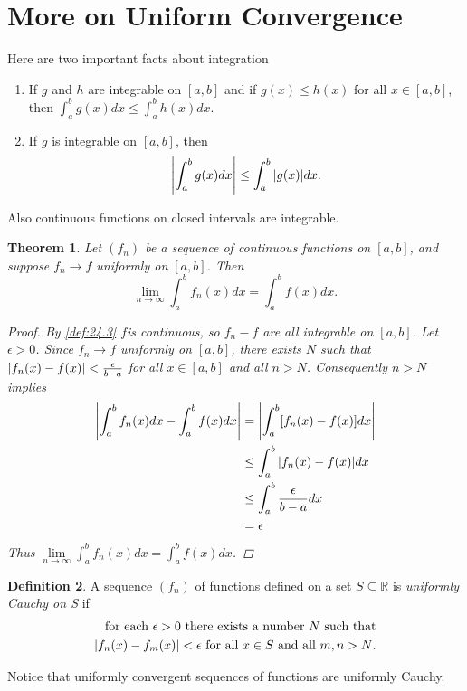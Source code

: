 \documentclass[12pt, lettersize]{book}
\theoremstyle{plain}
\newtheorem{thm}{Theorem}[section]
\theoremstyle{definition}
\newtheorem{dfn}[thm]{Definition}
\theoremstyle{remark}
\newcommand{\R}{\mathbb{R}}
\begin{document}
		\section{More on Uniform Convergence}
			Here are two important facts about integration
			\begin{enumerate}
				\item If $g$ and $h$ are integrable on $[a,b]$ and if $g(x)\leq h(x)$ for all $x\in[a,b]$, then $\int_{a}^{b}g(x)dx\leq\int_{a}^{b}h(x)dx$.
				\item If $g$ is integrable on $[a,b]$, then
				\begin{displaymath}
					\abs{\int_{a}^{b}g(x)dx}\leq\int_{a}^{b}\abs{g(x)}dx.
				\end{displaymath}
			\end{enumerate}
			Also continuous functions on closed intervals are integrable.
			
			\begin{thm}\label{thm:25.2}
			Let $(f_n)$ be a sequence of continuous functions on $[a,b]$, and suppose $f_n\rightarrow f$ uniformly on $[a,b]$. Then
			\begin{displaymath}
				\lim\limits_{n\rightarrow\infty}\int_{a}^{b}f_n(x)dx=\int_{a}^{b}f(x)dx.
			\end{displaymath}
			\begin{proof}
			By \ref{def:24.3} $f$is continuous, so $f_n-f$ are all integrable on $[a,b]$. Let $\epsilon>0$. Since $f_n\rightarrow f$ uniformly on $[a,b]$, there exists $N$ such that $\abs{f_n(x)-f(x)}<\frac{\epsilon}{b-a}$ for all $x\in[a,b]$ and all $n>N$. Consequently $n>N$ implies
			\begin{align*}
				\abs{\int_{a}^{b}f_n(x)dx-\int_{a}^{b}f(x)dx}&=\abs{\int_{a}^{b}[f_n(x)-f(x)]dx}\\
															 &\leq\int_{a}^{b}\abs{f_n(x)-f(x)}dx\\
															 &\leq\int_{a}^{b}\frac{\epsilon}{b-a}dx\\
															 &=\epsilon
			\end{align*}
			Thus $\lim\limits_{n\rightarrow\infty}\int_{a}^{b}f_n(x)dx=\int_{a}^{b}f(x)dx$.
			\end{proof}
			\end{thm}
			
			\begin{dfn}
			A sequence $(f_n)$ of functions defined on a set $S\subseteq\R$ is \emph{uniformly Cauchy on S} if
			\begin{align*}
				\text{for each $\epsilon>0$ there exists a number $N$ such that}\\
				\text{$\abs{f_n(x)-f_m(x)}<\epsilon$ for all $x\in S$ and all $m,n>N$.}
			\end{align*}
			\end{dfn}
			Notice that uniformly convergent sequences of functions are uniformly Cauchy.
			
\end{document}
